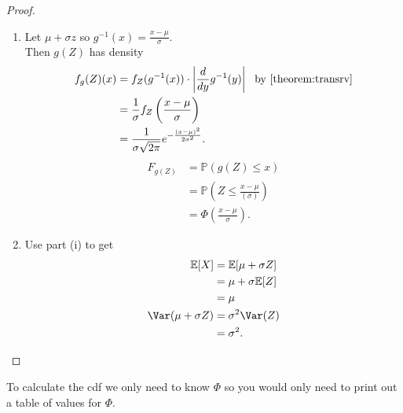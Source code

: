 \begin{proof} ~
    \begin{enumerate}
        \item Let $\mu + \sigma z$ so $g^{-1}(x) = \frac{x - \mu}{\sigma}$. \\
        Then $g(Z)$ has density 
        \begin{align*}
            f_g(Z)(x) &= f_Z(g^{-1}(x)) \cdot \left|\frac{d}{dy}g^{-1}(y)\right| \ \text{ by \Cref{theorem:transrv}} \\
            &= \frac{1}{\sigma} f_Z \left( \frac{x - \mu}{\sigma} \right) \\
            &= \frac{1}{\sigma \sqrt{2 \pi}} e^{- \frac{(x - \mu)^2}{2 \sigma^2}}.
        \end{align*}
        \mathitem \begin{align*}
            F_{g(Z)} &= \mathbb{P}(g(Z) \leq x) \\
            &= \mathbb{P}(Z \leq \frac{x - \mu}{(\sigma)}) \\
            &= \Phi \left( \frac{x - \mu}{\sigma} \right).
        \end{align*} 
        \item Use part (i) to get
        \begin{align*}
            \mathbb{E}[X] &= \mathbb{E}[\mu + \sigma Z] \\
            &= \mu + \sigma \mathbb{E}[Z] \\
            &= \mu \\
            \Var(\mu + \sigma Z) &= \sigma^2 \Var(Z) \\
            &= \sigma^2.
        \end{align*} 
    \end{enumerate} 
\end{proof} 

\begin{remark}
    To calculate the cdf we only need to know $\Phi$ so you would only need to print out a table of values for $\Phi$.
\end{remark} 

